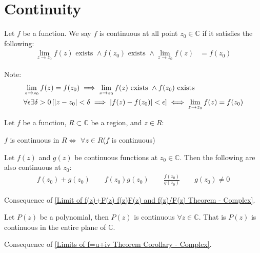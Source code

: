 \documentclass[12pt, english]{book}
\makeatletter
\renewenvironment{proof}[1][\proofname]{\par
	\pushQED{\qed}%
	\normalfont \topsep6\p@\@plus6\p@\relax
	\list{}{%
		\settowidth{\leftmargin}{\itshape\proofname:\hskip\labelsep}%
		\setlength{\labelwidth}{0pt}%
		\setlength{\itemindent}{-\leftmargin}%
	}%
	\item[\hskip\labelsep\itshape#1\@addpunct{:}]\ignorespaces
	}{ \popQED\endlist\@endpefalse}
\makeatother
\begin{document}
	\section{Continuity} \label{Continuinty Section - Complex}
	\begin{definition}[Continuous] \label{Continuity! of Function}
		\label{Continuous Function Definition - Complex}
		Let $f$ be a function. We say $f$ is continuous at all point $z_0 \in \mathbb{C}$ if it satisfies the following: 
		\begin{align*}
			\lim_{z \rightarrow z_0} f(z) \text{ exists } \land f(z_0) \text{ exists } \land
			\lim_{z\rightarrow z_0} f(z) &= f(z_0)
		\end{align*} 
	\end{definition}
	Note: 
	\begin{align*}
		&\lim_{z \rightarrow z_0} f(z) = f(z_0) \implies \lim_{z \rightarrow z_0} f(z) \text{ exists } \land f(z_0) \text{ exists } \\
		&\forall \epsilon \exists \delta>0 \left[\abs{z-z_0} < \delta \implies \abs{f(z) - f(z_0)} < \epsilon \right] \iff \lim_{z \rightarrow z_0} f(z) = f(z_0)
	\end{align*}
	
	\begin{definition} \label{Continuity! at a Region}
		Let $f$ be a function, $R \subset \mathbb{C}$ be a region, and $z \in R$: 
		\begin{center}
			$f$ is continuous in $R \iff$ $\forall z \in R$($f$ is continuous)
		\end{center}
	\end{definition}
	
	\begin{theorem} 
		Let $f(z)$ and $g(z)$ be continuous functions at $z_0 \in \mathbb{C}$. Then the following are also continuous at $z_0$:
		\begin{align*}
			f(z_0) + g(z_0) \qquad f(z_0)g(z_0) \qquad \frac{f(z_0)}{g(z_0)} \qquad g(z_0) \neq 0
		\end{align*}
		\label{Continuity of f(z)+g(z) f(z)g(z) and f(z)/g(z) Theorem - Complex}
	\end{theorem}
	\begin{proof}
		Consequence of \cref{Limit of f(z)+F(z) f(z)F(z) and f(z)/F(z) Theorem - Complex}.
	\end{proof}

	\begin{corollary} 
		Let $P(z)$ be a polynomial, then $P(z)$ is continuous $\forall z \in \mathbb{C}$. That is $P(z)$ is continuous in the entire plane of $\mathbb{C}$.
		\label{Continuity of f(z)+g(z) f(z)g(z) and f(z)/g(z) Corollary - Complex}
	\end{corollary}
	\begin{proof}
		Consequence of \cref{Limits of f=u+iv Theorem Corollary - Complex}.
	\end{proof}
	
\end{document}
